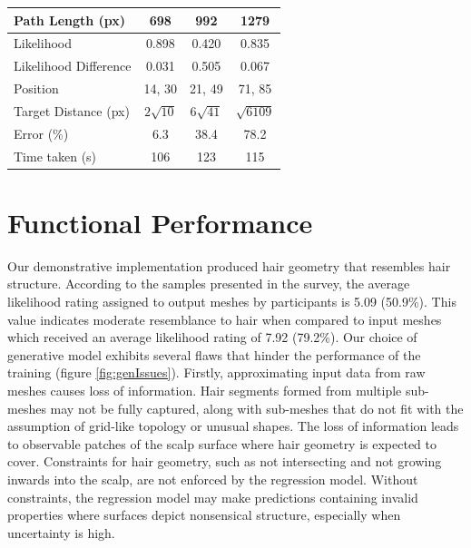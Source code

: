 \documentclass[ %
author={Dillon Keith Diep},
supervisor={Dr. Carl Henrik Ek},
degree={MEng},
title={ART-CG Hair:},
subtitle={Assisted Real-time Content Generation of Stylised Virtual Hair},
type={Research},
year={2017} ]{dissertation}
\begin{document}
\begin{table}[!h]
\begin{tabular}{|l|c|c|c|}
		\hline
		Path Length (px) & 698 & 992 & 1279\\
		\hline 
		Likelihood & 0.898 & 0.420 & 0.835\\
		\hline
		Likelihood Difference & 0.031 & 0.505 & 0.067\\
		\hline
		Position & 14, 30 & 21, 49 & 71, 85\\
		\hline
		Target Distance (px) & $2\sqrt{10}$ & $6\sqrt{41}$ & $\sqrt{6109}$\\
		\hline
		Error (\%) & 6.3 & 38.4 & 78.2\\
		\hline
		Time taken (s) & 106 & 123 & 115\\
		\hline
	\end{tabular}
	\label{nickresult}
\end{table}

\section{Functional Performance}
\label{evaluation:functional}
Our demonstrative implementation produced hair geometry that resembles hair structure. According to the samples presented in the survey, the average likelihood rating assigned to output meshes by participants is 5.09 (50.9\%). This value indicates moderate resemblance to hair when compared to input meshes which received an average likelihood rating of 7.92 (79.2\%). Our choice of generative model exhibits several flaws that hinder the performance of the training (figure \ref{fig:genIssues}). Firstly, approximating input data from raw meshes causes loss of information. Hair segments formed from multiple sub-meshes may not be fully captured, along with sub-meshes that do not fit with the assumption of grid-like topology or unusual shapes. The loss of information leads to observable patches of the scalp surface where hair geometry is expected to cover. Constraints for hair geometry, such as not intersecting and not growing inwards into the scalp, are not enforced by the regression model. Without constraints, the regression model may make predictions containing invalid properties where surfaces depict nonsensical structure, especially when uncertainty is high.
\end{document}
